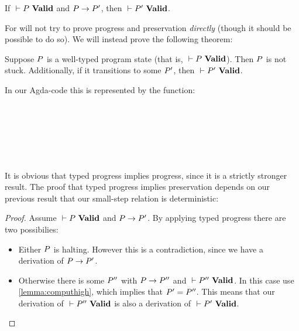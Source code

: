 \begin{theorem}
  \label{lemma:atalpreservation}
  If ${} |- {P}\ \mathbf{Valid}$ and $P -> P'$, then ${} |- {P'}\ \mathbf{Valid}$.
\end{theorem}

For \ATAL will not try to prove progress and preservation \emph{directly}
(though it should be possible to do so). We will instead prove the following
theorem:

\begin{theorem}
  \label{lemma:atalprogress+}
  Suppose $P$ is a well-typed program state (that is,
  ${} |- {P}\ \mathbf{Valid}$). Then $P$ is not stuck. Additionally, if it
  transitions to some $P'$, then ${} |- {P'}\ \mathbf{Valid}$.
\end{theorem}

In our Agda-code this is represented by the function:

\begin{code}
\> \AgdaSymbol{:}  \AgdaSymbol{\{}\AgdaSymbol{\}} \<%
\\
\>[2]\<[19]%
\>[19]   \<%
\\
\>[2]\<[19]%
\>[19]  \<%
\\
\>[2]\<[19]%
\>[19]\AgdaSymbol{(}   \<%
\\
\>[19]\<[21]%
\>[21]   \<%
\\
\>[19]\<[21]%
\>[21]   \AgdaSymbol{)}\<%
\end{code}

It is obvious that typed progress implies progress, since it is a strictly
stronger result. The proof that typed progress implies preservation depends on
our previous result that our small-step relation is deterministic:

\begin{proof}
  Assume ${} |- {P}\ \mathbf{Valid}$ and $P -> P'$. By applying typed
  progress there are two possibilies:

  \begin{itemize}
  \item Either $P$ is halting. However this is a contradiction, since we
    have a derivation of $P -> P'$.

  \item Otherwise there is some $P''$ with $P -> P''$ and
    ${} |- {P''}\ \mathbf{Valid}$. In this case use \cref{lemma:computhigh}, which
    implies that $P' = P''$. This means that our derivation of
    ${} |- {P''}\ \mathbf{Valid}$ is also a derivation of ${} |- {P'}\ \mathbf{Valid}$.
  \end{itemize}
\end{proof}


